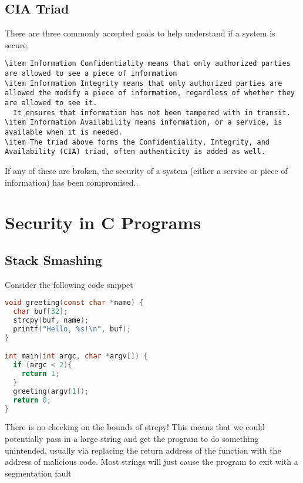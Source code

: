
\subsection{CIA Triad}

There are three commonly accepted goals to help understand if a system is secure.

\begin{lstlisting}
\item Information Confidentiality means that only authorized parties are allowed to see a piece of information
\item Information Integrity means that only authorized parties are allowed the modify a piece of information, regardless of whether they are allowed to see it.
  It ensures that information has not been tampered with in transit.
\item Information Availability means information, or a service, is available when it is needed.
\item The triad above forms the Confidentiality, Integrity, and Availability (CIA) triad, often authenticity is added as well.
\end{lstlisting}

If any of these are broken, the security of a system (either a service or piece of information) has been compromised..

\section{Security in C Programs}

\subsection{Stack Smashing}

Consider the following code snippet

\begin{lstlisting}[language=C]
void greeting(const char *name) {
  char buf[32];
  strcpy(buf, name);
  printf("Hello, %s!\n", buf);
}

int main(int argc, char *argv[]) {
  if (argc < 2){
    return 1;
  }
  greeting(argv[1]);
  return 0;
}
\end{lstlisting}

There is no checking on the bounds of strcpy!
This means that we could potentially pass in a large string and get the program to do something unintended, usually via replacing the return address of the function with the address of malicious code.
Most strings will just cause the program to exit with a segmentation fault

